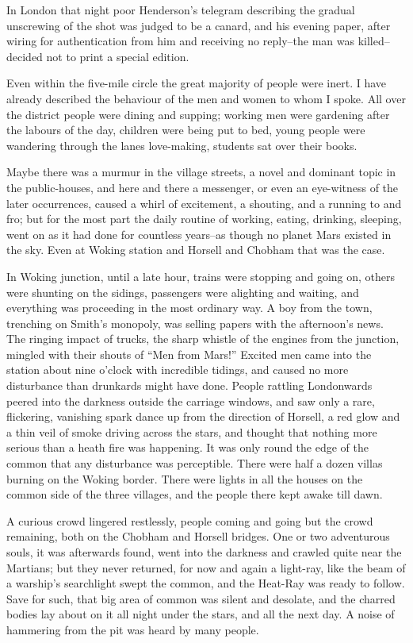 In London that night poor Henderson's telegram describing the
gradual unscrewing of the shot was judged to be a canard, and his
evening paper, after wiring for authentication from him and
receiving no reply--the man was killed--decided not to print a
special edition.

Even within the five-mile circle the great majority of people were
inert. I have already described the behaviour of the men and women
to whom I spoke. All over the district people were dining and
supping; working men were gardening after the labours of the day,
children were being put to bed, young people were wandering through
the lanes love-making, students sat over their books.

Maybe there was a murmur in the village streets, a novel and
dominant topic in the public-houses, and here and there a
messenger, or even an eye-witness of the later occurrences, caused
a whirl of excitement, a shouting, and a running to and fro; but
for the most part the daily routine of working, eating, drinking,
sleeping, went on as it had done for countless years--as though no
planet Mars existed in the sky. Even at Woking station and Horsell
and Chobham that was the case.

In Woking junction, until a late hour, trains were stopping and
going on, others were shunting on the sidings, passengers were
alighting and waiting, and everything was proceeding in the most
ordinary way. A boy from the town, trenching on Smith's monopoly,
was selling papers with the afternoon's news. The ringing impact of
trucks, the sharp whistle of the engines from the junction, mingled
with their shouts of ``Men from Mars!'' Excited men came into the
station about nine o'clock with incredible tidings, and caused no
more disturbance than drunkards might have done. People rattling
Londonwards peered into the darkness outside the carriage windows,
and saw only a rare, flickering, vanishing spark dance up from the
direction of Horsell, a red glow and a thin veil of smoke driving
across the stars, and thought that nothing more serious than a
heath fire was happening. It was only round the edge of the common
that any disturbance was perceptible. There were half a dozen
villas burning on the Woking border. There were lights in all the
houses on the common side of the three villages, and the people
there kept awake till dawn.

A curious crowd lingered restlessly, people coming and going but
the crowd remaining, both on the Chobham and Horsell bridges. One
or two adventurous souls, it was afterwards found, went into the
darkness and crawled quite near the Martians; but they never
returned, for now and again a light-ray, like the beam of a
warship's searchlight swept the common, and the Heat-Ray was ready
to follow. Save for such, that big area of common was silent and
desolate, and the charred bodies lay about on it all night under
the stars, and all the next day. A noise of hammering from the pit
was heard by many people.

